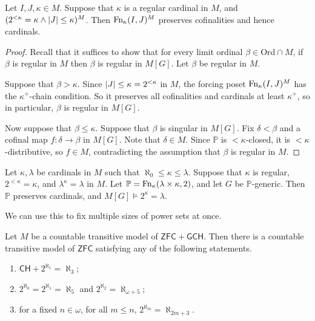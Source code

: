 \begin{theorem}
    Let \( I, J, \kappa \in M \).
    Suppose that \( \kappa \) is a regular cardinal in \( M \), and \( (2^{<\kappa} = \kappa \wedge \abs{J} \leq \kappa)^M \).
    Then \( \operatorname{Fn}_\kappa(I, J)^M \) preserves cofinalities and hence cardinals.
\end{theorem}
\begin{proof}
    Recall that it suffices to show that for every limit ordinal \( \beta \in \mathrm{Ord} \cap M \), if \( \beta \) is regular in \( M \) then \( \beta \) is regular in \( M[G] \).
    Let \( \beta \) be regular in \( M \).

    Suppose that \( \beta > \kappa \).
    Since \( \abs{J} \leq \kappa = 2^{<\kappa} \) in \( M \), the forcing poset \( \operatorname{Fn}_\kappa(I, J)^M \) has the \( \kappa^+ \)-chain condition.
    So it preserves all cofinalities and cardinals at least \( \kappa^+ \), so in particular, \( \beta \) is regular in \( M[G] \).

    Now suppose that \( \beta \leq \kappa \).
    Suppose that \( \beta \) is singular in \( M[G] \).
    Fix \( \delta < \beta \) and a cofinal map \( f : \delta \to \beta \) in \( M[G] \).
    Note that \( \delta \in M \).
    Since \( \mathbb P \) is \( <\kappa \)-closed, it is \( <\kappa \)-distributive, so \( f \in M \), contradicting the assumption that \( \beta \) is regular in \( M \).
\end{proof}
\begin{theorem}
    Let \( \kappa, \lambda \) be cardinals in \( M \) such that \( \aleph_0 \leq \kappa \leq \lambda \).
    Suppose that \( \kappa \) is regular, \( 2^{<\kappa} = \kappa \), and \( \lambda^\kappa = \lambda \) in \( M \).
    Let \( \mathbb P = \operatorname{Fn}_\kappa(\lambda \times \kappa, 2) \), and let \( G \) be \( \mathbb P \)-generic.
    Then \( \mathbb P \) preserves cardinals, and \( M[G] \vDash 2^\kappa = \lambda \).
\end{theorem}
We can use this to fix multiple sizes of power sets at once.
\begin{theorem}
    Let \( M \) be a countable transitive model of \( \mathsf{ZFC} + \mathsf{GCH} \).
    Then there is a countable transitive model of \( \mathsf{ZFC} \) satisfying any of the following statements.
    \begin{enumerate}
        \item \( \mathsf{CH} + 2^{\aleph_1} = \aleph_3 \);
        \item \( 2^{\aleph_0} = 2^{\aleph_1} = \aleph_5 \) and \( 2^{\aleph_2} = \aleph_{\omega + 5} \);
        \item for a fixed \( n \in \omega \), for all \( m \leq n \), \( 2^{\aleph_m} = \aleph_{2m + 3} \).
    \end{enumerate}
\end{theorem}
